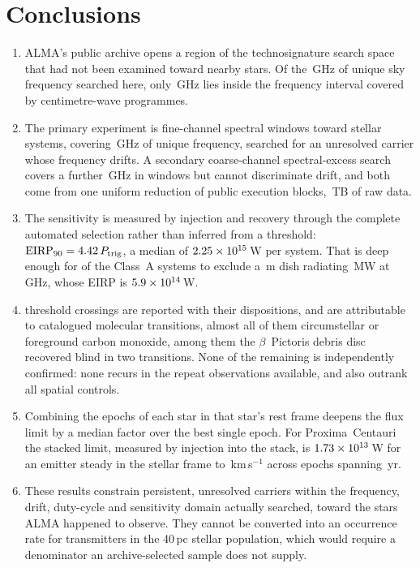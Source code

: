 \section{Conclusions}
\label{sec:conclusions}

\begin{enumerate}[leftmargin=1.6em,itemsep=4pt,topsep=4pt,parsep=0pt]

\item ALMA's public archive opens a region of the technosignature search
space that had not been examined toward nearby stars. Of the
\UnionGHz\,GHz of unique sky frequency searched here, only
\UnionBandThree\,GHz lies inside the frequency interval covered by
centimetre-wave programmes.

\item The primary experiment is \NWinA{} fine-channel spectral windows
toward \NSysClassA{} stellar systems, covering \DnuA\,GHz of unique
frequency, searched for an unresolved carrier whose frequency drifts. A
secondary coarse-channel spectral-excess search covers a further
\DnuBonly\,GHz in \NWinB{} windows but cannot discriminate drift, and both
come from one uniform reduction of \LedProcessed{} public execution blocks,
\TotalDataTB\,TB of raw data.

\item The sensitivity is measured by injection and recovery through the
complete automated selection rather than inferred from a threshold:
$\mathrm{EIRP}_{90}=4.42\,P_{\rm trig}$, a median of
$2.25\times10^{15}$\,W per system. That is deep enough for
\BenchNSysA{} of the \NSysClassA{} Class~A systems to exclude a
\BenchDiam\,m dish radiating \BenchPowerMW\,MW at \BenchFreqGHz\,GHz, whose
EIRP is $5.9\times10^{14}$\,W.

\item \NCross{} threshold crossings are reported with their dispositions,
and \NAttributed{} are attributable to catalogued molecular transitions,
almost all of them circumstellar or foreground carbon monoxide, among them
the $\beta$~Pictoris debris disc recovered blind in two transitions. None of the remaining \NUnattributed{} is independently
confirmed: none recurs in the repeat observations available, and
\NUnattrRankFlagged{} also outrank all \NCtrl{} spatial controls.

\item Combining the epochs of each star in that star's rest frame deepens
the flux limit by a median factor \StkLimitGainMed{} over the best single
epoch. For Proxima~Centauri the stacked limit, measured by injection into the
stack, is $1.73\times10^{13}$\,W for an emitter steady in the stellar frame to
\StkProxTolKms\,km\,s$^{-1}$ across epochs spanning \StkProxSpanYr\,yr.

\item These results constrain persistent, unresolved carriers within the
frequency, drift, duty-cycle and sensitivity domain actually searched,
toward the stars ALMA happened to observe. They cannot be converted into an
occurrence rate for transmitters in the 40\,pc stellar population, which
would require a denominator an archive-selected sample does not supply.

\end{enumerate}
